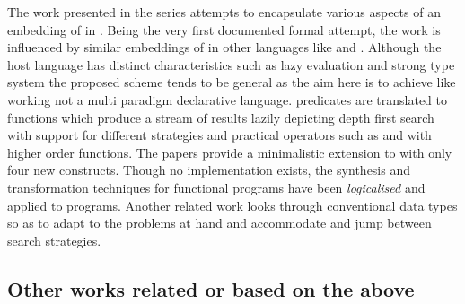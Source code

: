 \documentclass[thesis-solanki.tex]{subfiles}
\begin{document}
The work presented in the series
\cite{spivey1999embedding,seres1999algebra,seres2001higher,spivey1999algebra,seres2001algebra} attempts to
encapsulate various aspects of an embedding of  in .
Being the very first documented formal attempt, the work is influenced by similar embeddings of 
in other languages like  and .
Although the host language has distinct characteristics such as lazy evaluation and strong type system the proposed
scheme tends to be general as the aim here is to achieve
 like working not a multi paradigm
declarative language.
 predicates are translated to  functions which produce a stream of results
lazily depicting depth first search with support for different strategies and practical operators such as
 and  with higher order functions.
The papers provide a minimalistic extension to  with only four new constructs.
Though no implementation exists, the synthesis and transformation techniques for functional programs have been
\textit{logicalised} and applied to  programs.
Another related work \cite{spivey2000functional} looks through conventional data types so as to adapt to the
problems at hand and accommodate and jump between search strategies.


\subsection{Other works related or based on the above}

\end{document}
